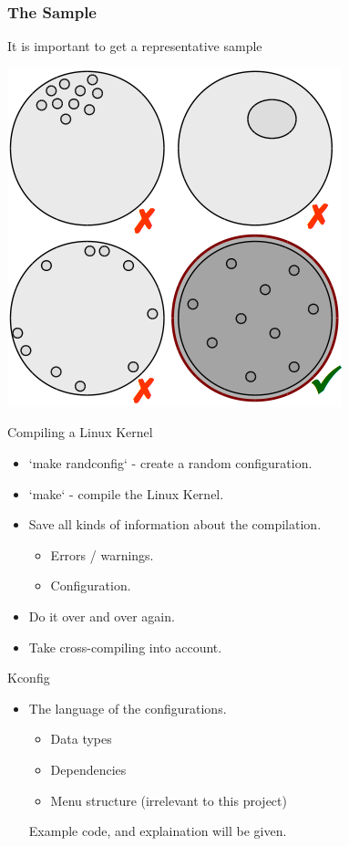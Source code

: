 \documentclass[mathserif,serif]{beamer}
\newenvironment{items}{
\begin{itemize}
  \setlength{\itemsep}{0pt}
  \setlength{\parskip}{7pt}
  \setlength{\parsep}{4pt}
}{\end{itemize}}
\begin{document}
\begin{frame}[t]
    
    \frametitle{The Sample}
    

    It is important to get a representative sample

    \includegraphics[scale=.5]{sample.png}
\end{frame}

\begin{frame}[t]{Compiling a Linux Kernel}

    \begin{items}
        \item `make randconfig` - create a random configuration.
        \item `make` - compile the Linux Kernel.
        \item Save all kinds of information about the compilation.
        \begin{items}
            \item Errors / warnings.
            \item Configuration.
        \end{items}
        \item Do it over and over again.
        \item Take cross-compiling into account.
    \end{items}


\end{frame}

\begin{frame}[t]{Kconfig}

    \begin{items}
        \item The language of the configurations.
        \begin{items}
            \item Data types
            \item Dependencies
            \item Menu structure (irrelevant to this project)
        \end{items}


    Example code, and explaination will be given.
    \end{items}
\end{frame}
\end{document}
